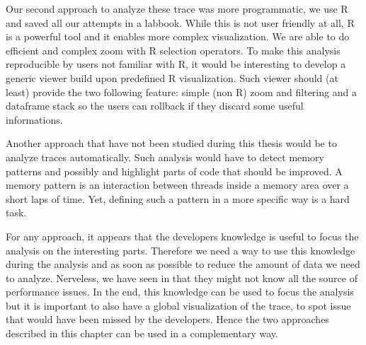 Our second approach to analyze these trace was more programmatic, we use \gls{R} and saved all our attempts in a labbook.
While this is not user friendly at all, \gls{R} is a powerful tool and it enables more complex visualization.
We are able to do efficient and complex zoom with \gls{R} selection operators.
To make this analysis reproducible by users not familiar with \gls{R}, it would be interesting to develop a generic viewer build upon predefined \gls{R} visualization.
Such viewer should (at least) provide the two following feature: simple (non \gls{R}) zoom and filtering and a dataframe stack so the users can rollback if they discard some useful informations.

Another approach that have not been studied during this thesis would be to analyze traces automatically.
Such analysis would have to detect memory patterns and possibly and highlight parts of code that should be improved.
A memory pattern is an interaction between threads inside a memory area over a short laps of time.
Yet, defining such a pattern in a more specific way is a hard task.

For any approach, it appears that the developers knowledge is useful to focus the analysis on the interesting parts.
Therefore we need a way to use this knowledge during the analysis and as soon as possible to reduce the amount of data we need to analyze.
Nerveless, we have seen in  that they might not know all the source of performance issues.
In the end, this knowledge can be used to focus the analysis but it is important to also have a global visualization of the trace, to spot issue that would have been missed by the developers.
Hence the two approaches described in this chapter can be used in a complementary way.

